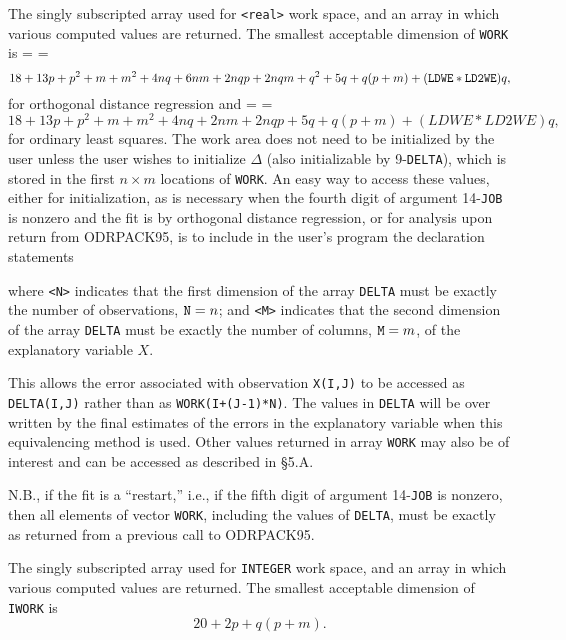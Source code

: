 
\aligntobox The singly subscripted array used for {\tt <real>} work space, and
an array in which various computed values are returned. The smallest acceptable
dimension of {\tt WORK} is 
{
=\rmIX
{}=\itIX
$$
18+13p+p^2+m+m^2+4nq+6nm+2nqp+2nqm+q^2+5q+q(p+m)+({\tt LDWE}*{\tt LD2WE})q,
$$}for orthogonal distance regression and
{
=\rmIX
{}=\itIX
$$
18+13p+p^2+m+m^2+4nq+2nm+2nqp+5q+q(p+m)+(LDWE*LD2WE)q,
$$}for ordinary least squares.
The work area does not need to be initialized by the user unless the
user wishes to initialize $\Delta$ (also initializable by 9-{\tt DELTA}),
which is stored in the first $n\times m$ locations of {\tt WORK}. An easy
way to access these values, either for initialization, as is necessary
when the fourth digit of argument 14-{\tt JOB} is nonzero and the fit
is by orthogonal distance regression, or for analysis upon return from
ODRPACK95, is to include in the user's program the declaration statements


\aligntobox where {\tt <N>} indicates that the first dimension of the array {\tt DELTA} must be exactly the number of observations, ${\tt N}= n$; and {\tt <M>} indicates that the second dimension of the array {\tt DELTA} must be exactly the number of columns, ${\tt M}= m$, of the explanatory variable $X$. 

\aligntobox This allows the error associated with observation {\tt X(I,J)} to be accessed as {\tt DELTA(I,J)} rather than as {\tt WORK(I+(J-1)*N)}. The values in {\tt DELTA} will be over written by the final estimates of the errors in the explanatory variable when this equivalencing method is used. Other values returned in array {\tt WORK} may also be of interest and can be accessed as described in \S 5.A.

\aligntobox N.B., if the fit is a ``restart,'' i.e., if the fifth digit of
argument 14-{\tt JOB} is nonzero, then all elements of vector {\tt WORK},
including the values of {\tt DELTA}, must be exactly as returned from a previous
call to ODRPACK95.


\aligntobox The singly subscripted array used for {\tt INTEGER} work
space, and an array in which various computed values are returned. The
smallest acceptable dimension of {\tt IWORK} is
$$
20+2p+q(p+m).
$$


